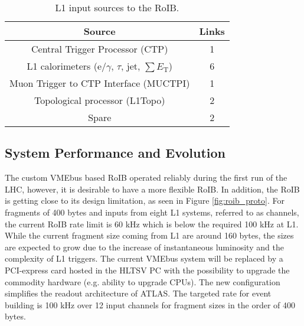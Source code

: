 \begin{table}[tbp]
\caption{L1 input sources to the RoIB.}
\label{tab:roib_links}
\smallskip
\centering
\begin{tabular}{|c|c|}
\hline
Source & Links\\
\hline
Central Trigger Processor (CTP)  & 1  \\
L1 calorimeters (e/$\gamma$, $\tau$, jet, $\sum E_\mathrm{T}$) & 6  \\
Muon Trigger to CTP Interface (MUCTPI) & 1  \\
Topological processor (L1Topo) & 2  \\
Spare & 2 \\
\hline
\end{tabular}
\end{table}

\subsection{System Performance and Evolution}\label{sec:roib_limit}

The custom VMEbus based RoIB operated reliably during the first run of the LHC, however, it is desirable to have a more flexible RoIB. 
In addition, the RoIB is getting close to its design limitation, as seen 
in Figure \ref{fig:roib_proto}. For fragments of 400 bytes and inputs from eight L1 systems, referred to as channels, the current RoIB rate limit is 60 kHz which is below the required 100 kHz at 
L1. While the current fragment size coming from L1 are around 160 bytes, the sizes are expected to grow due to the increase of instantaneous 
luminosity and the complexity of L1 triggers. The current VMEbus system will be replaced by a PCI-express card hosted in the HLTSV PC with the 
possibility to upgrade the commodity hardware (e.g. ability to upgrade CPUs). 
The new configuration simplifies the readout architecture of ATLAS. The targeted rate for event building is 100 kHz over 12 input channels for 
fragment sizes in the order of 400 bytes.
